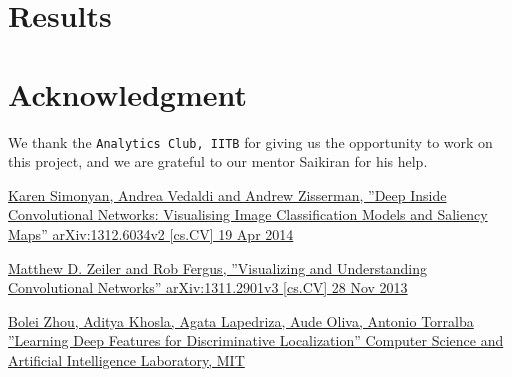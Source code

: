 \documentclass[conference]{IEEEtran}
\begin{document}
\section{Results}
\section*{Acknowledgment}

We thank the \texttt{Analytics Club, IITB} for giving us the opportunity to work on this project, and we are grateful to our mentor Saikiran for his help.


\begin{thebibliography}{00}
 \href{https://arxiv.org/pdf/1312.6034.pdf}{Karen Simonyan, Andrea Vedaldi and Andrew Zisserman, ''Deep Inside Convolutional Networks: Visualising
Image Classification Models and Saliency Maps'' arXiv:1312.6034v2 [cs.CV] 19 Apr 2014}

 \href{https://arxiv.org/pdf/1311.2901.pdf}{Matthew D. Zeiler and Rob Fergus, ''Visualizing and Understanding Convolutional Networks'' arXiv:1311.2901v3 [cs.CV] 28 Nov 2013}

 \href{http://cnnlocalization.csail.mit.edu/Zhou_Learning_Deep_Features_CVPR_2016_paper.pdf}{Bolei Zhou, Aditya Khosla, Agata Lapedriza, Aude Oliva, Antonio Torralba ''Learning Deep Features for Discriminative Localization'' Computer Science and Artificial Intelligence Laboratory, MIT}
\end{thebibliography}
\end{document}

